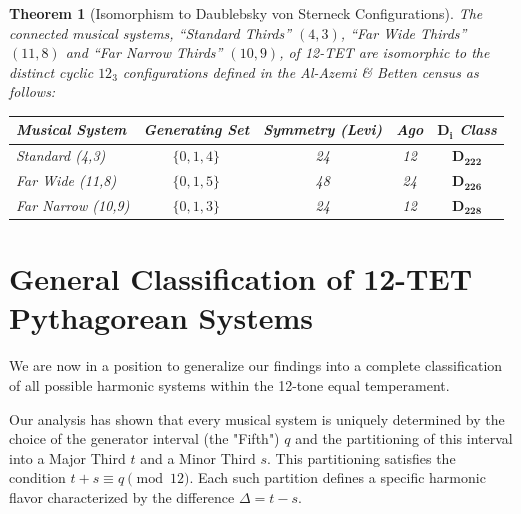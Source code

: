 \documentclass[12pt,letterpaper]{amsart}
\newtheorem{theorem}{Theorem}
\begin{document}
\begin{theorem}[Isomorphism to Daublebsky von Sterneck Configurations]
The connected musical systems, ``Standard Thirds'' $(4,3)$, ``Far Wide Thirds'' $(11,8)$ and ``Far Narrow Thirds'' $(10,9)$,  of 12-TET are isomorphic to the distinct cyclic $12_3$ configurations defined in the Al-Azemi \& Betten census as follows:

\begin{center}
\begin{tabular}{|l|c|c|c|c|}
\hline
\emph{\textbf{Musical System}} & \emph{\textbf{Generating Set}} & \emph{\textbf{Symmetry (Levi)}} & \emph{\textbf{Ago}} & $\mathbf{D_i}$ \emph{\textbf{Class}} \\
\hline
\emph{Standard (4,3)} & $\{0, 1, 4\}$ & \emph{24} & \emph{12} & $\mathbf{D_{222}}$ \\
\emph{Far Wide (11,8)} & $\{0, 1, 5\}$ & \emph{48} & \emph{24} & $\mathbf{D_{226}}$ \\
\emph{Far Narrow (10,9)} & $\{0, 1, 3\}$ & \emph{24} & \emph{12} & $\mathbf{D_{228}}$ \\
\hline
\end{tabular}
\end{center}
\vspace{0.2cm}
\end{theorem}




\section{General Classification of 12-TET Pythagorean Systems}
\label{sec:classification_theorem}

We are now in a position to generalize our findings into a complete classification of all possible harmonic systems within the 12-tone equal temperament.

Our analysis has shown that every musical system is uniquely determined by the choice of the generator interval (the "Fifth") $q$ and the partitioning of this interval into a Major Third $t$ and a Minor Third $s$. This partitioning satisfies the condition $t+s \equiv q \pmod{12}$. Each such partition defines a specific harmonic flavor characterized by the difference $\Delta = t-s$.
\end{document}
